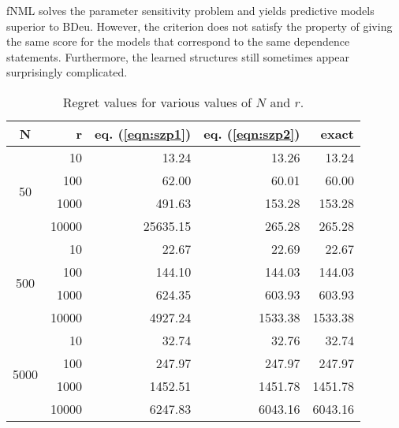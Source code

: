 fNML solves the parameter sensitivity problem and yields predictive
models superior to BDeu.  However, the criterion does not satisfy the
property of giving the same score for the models that correspond to
the same dependence statements. Furthermore, the learned structures
still sometimes appear surprisingly complicated.

\begin{table}
\centering
\begin{tabular}{crrrr}
\toprule
N & r & eq. (\ref{eqn:szp1}) & eq. (\ref{eqn:szp2}) & exact \\
\midrule
\multirow{4}{*}{50} & 10 & 13.24 & 13.26 & 13.24 \\
& 100 & 62.00 & 60.01 & 60.00 \\
& 1000 & 491.63 & 153.28 & 153.28 \\
& 10000 & 25635.15 & 265.28 & 265.28 \\
\midrule
\multirow{4}{*}{500} & 10 & 22.67 & 22.69 & 22.67 \\
& 100 & 144.10 & 144.03 & 144.03 \\
& 1000 & 624.35 & 603.93 & 603.93 \\
& 10000 & 4927.24 & 1533.38 & 1533.38 \\
\midrule
\multirow{4}{*}{5000} & 10 & 32.74 & 32.76 & 32.74 \\
& 100 & 247.97 & 247.97 & 247.97 \\
& 1000 & 1452.51 & 1451.78 & 1451.78 \\
& 10000 & 6247.83 & 6043.16 & 6043.16 \\
\bottomrule
\end{tabular}
\caption{Regret values for various values of $N$ and $r$.}
\label{tbl:regrets}
\end{table}
